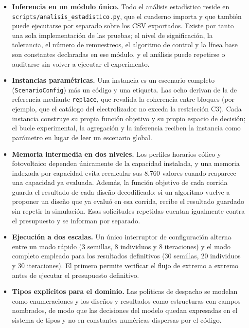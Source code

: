 \begin{itemize}
    \item \textbf{Inferencia en un módulo único.} Todo el análisis estadístico reside en \texttt{scripts/analisis\_estadistico.py}, que el cuaderno importa y que también puede ejecutarse por separado sobre los CSV exportados. Existe por tanto una sola implementación de las pruebas; el nivel de significación, la tolerancia, el número de remuestreos, el algoritmo de control y la línea base son constantes declaradas en ese módulo, y el análisis puede repetirse o auditarse sin volver a ejecutar el experimento.

    \item \textbf{Instancias paramétricas.} Una instancia es un escenario completo (\texttt{ScenarioConfig}) más un código y una etiqueta. Las ocho derivan de la de referencia mediante \texttt{replace}, que revalida la coherencia entre bloques (por ejemplo, que el catálogo del electrolizador no exceda la restricción C3). Cada instancia construye su propia función objetivo y su propio espacio de decisión; el bucle experimental, la agregación y la inferencia reciben la instancia como parámetro en lugar de leer un escenario global.

    \item \textbf{Memoria intermedia en dos niveles.} Los perfiles horarios eólico y fotovoltaico dependen únicamente de la capacidad instalada, y una memoria indexada por capacidad evita recalcular sus 8.760 valores cuando reaparece una capacidad ya evaluada. Además, la función objetivo de cada corrida guarda el resultado de cada diseño decodificado: si un algoritmo vuelve a proponer un diseño que ya evaluó en esa corrida, recibe el resultado guardado sin repetir la simulación. Esas solicitudes repetidas cuentan igualmente contra el presupuesto y se informan por separado.

    \item \textbf{Ejecución a dos escalas.} Un único interruptor de configuración alterna entre un modo rápido (3 semillas, 8 individuos y 8 iteraciones) y el modo completo empleado para los resultados definitivos (30 semillas, 20 individuos y 30 iteraciones). El primero permite verificar el flujo de extremo a extremo antes de ejecutar el presupuesto definitivo.

    \item \textbf{Tipos explícitos para el dominio.} Las políticas de despacho se modelan como enumeraciones y los diseños y resultados como estructuras con campos nombrados, de modo que las decisiones del modelo quedan expresadas en el sistema de tipos y no en constantes numéricas dispersas por el código.
\end{itemize}

